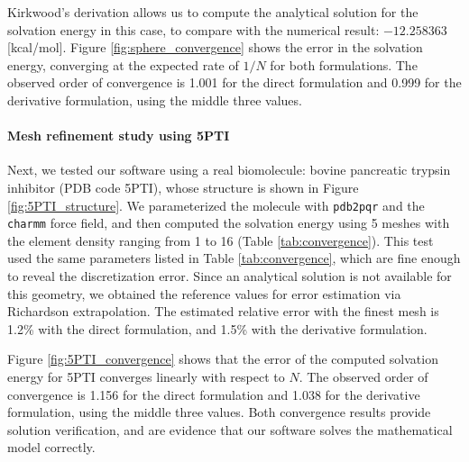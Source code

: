 Kirkwood's derivation \cite{kirkwood1934theory} allows us to compute the analytical solution for the solvation energy in this case, to compare with the numerical result: $-12.258363$ [kcal/mol].
Figure \ref{fig:sphere_convergence} shows the error in the solvation energy, converging at the expected rate of $1/N$ for both formulations.
The observed order of convergence is 1.001 for the direct formulation and 0.999 for the derivative formulation, using the middle three values.

\paragraph{Mesh refinement study using 5PTI} \label{result_convergence_5PTI}

Next, we tested our software using a real biomolecule: bovine pancreatic trypsin inhibitor (PDB code 5PTI), whose structure \cite{wlodawer1984structure} is shown in Figure \ref{fig:5PTI_structure}.
We parameterized the molecule with \texttt{pdb2pqr} and the \texttt{charmm} \cite{brooksCHARMMProgramMacromolecular1983} force field, and then computed the solvation energy using 5 meshes with the element density ranging from 1 to 16 (Table \ref{tab:convergence}).
This test used the same parameters listed in Table \ref{tab:convergence}, which are fine enough to reveal the discretization error.
Since an analytical solution is not available for this geometry, we obtained the reference values for error estimation via Richardson extrapolation.
The estimated relative error with the finest mesh is 1.2\% with the direct formulation, and 1.5\% with the derivative formulation.



Figure \ref{fig:5PTI_convergence} shows that the error of the computed solvation energy for 5PTI converges linearly with respect to $N$.
The observed order of convergence is 1.156 for the direct formulation and 1.038 for the derivative formulation, using the middle three values.
Both convergence results provide solution verification, and are evidence that our software solves the mathematical model correctly.

